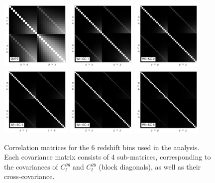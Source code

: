 \documentclass[useAMS,usenatbib]{mn2e}
\begin{document}
  \begin{figure}
    \centering
    \includegraphics[width=0.3\textwidth]{cov_2mpz.pdf}
    \includegraphics[width=0.3\textwidth]{cov_wisc1.pdf}
    \includegraphics[width=0.3\textwidth]{cov_wisc2.pdf}
    \includegraphics[width=0.3\textwidth]{cov_wisc3.pdf}
    \includegraphics[width=0.3\textwidth]{cov_wisc4.pdf}
    \includegraphics[width=0.3\textwidth]{cov_wisc5.pdf}
    \caption{Correlation matrices for the 6 redshift bins used in the analysis. Each covariance matrix consists of 4 sub-matrices, corresponding to the covariances of $C^{gg}_\ell$ and $C^{gy}_\ell$ (block diagonals), as well as their cross-covariance.}
    \label{fig:covs}
  \end{figure}
\end{document}
